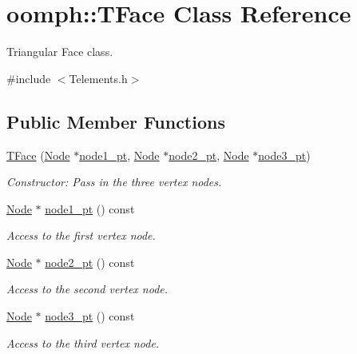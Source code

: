 \hypertarget{classoomph_1_1TFace}{}\section{oomph\+:\+:T\+Face Class Reference}
\label{classoomph_1_1TFace}


Triangular Face class.  




{\ttfamily \#include $<$Telements.\+h$>$}

\subsection*{Public Member Functions}
\begin{DoxyCompactItemize}
\item 
\hyperlink{classoomph_1_1TFace_a7f4f3d45cde2ddb0cfe2ccad5e89d423}{T\+Face} (\hyperlink{classoomph_1_1Node}{Node} $\ast$\hyperlink{classoomph_1_1TFace_a9beeb47006fee3e8f0ee1abe0113c77d}{node1\+\_\+pt}, \hyperlink{classoomph_1_1Node}{Node} $\ast$\hyperlink{classoomph_1_1TFace_a460a1e071534f0044b11e4143ccd0213}{node2\+\_\+pt}, \hyperlink{classoomph_1_1Node}{Node} $\ast$\hyperlink{classoomph_1_1TFace_ade89b1a048f53fc0919d0bc6c0d837b8}{node3\+\_\+pt})
\begin{DoxyCompactList}\small\item\em Constructor\+: Pass in the three vertex nodes. \end{DoxyCompactList}\item 
\hyperlink{classoomph_1_1Node}{Node} $\ast$ \hyperlink{classoomph_1_1TFace_a9beeb47006fee3e8f0ee1abe0113c77d}{node1\+\_\+pt} () const
\begin{DoxyCompactList}\small\item\em Access to the first vertex node. \end{DoxyCompactList}\item 
\hyperlink{classoomph_1_1Node}{Node} $\ast$ \hyperlink{classoomph_1_1TFace_a460a1e071534f0044b11e4143ccd0213}{node2\+\_\+pt} () const
\begin{DoxyCompactList}\small\item\em Access to the second vertex node. \end{DoxyCompactList}\item 
\hyperlink{classoomph_1_1Node}{Node} $\ast$ \hyperlink{classoomph_1_1TFace_ade89b1a048f53fc0919d0bc6c0d837b8}{node3\+\_\+pt} () const
\begin{DoxyCompactList}\small\item\em Access to the third vertex node. \end{DoxyCompactList}\item 

\end{DoxyCompactItemize}
